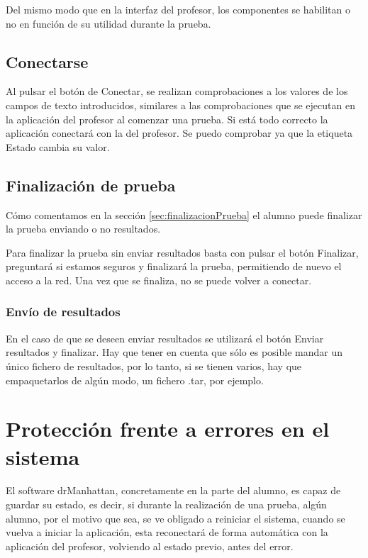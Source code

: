 \documentclass[11pt]{article}
\begin{document}
Del mismo modo que en la interfaz del profesor, los componentes se habilitan o no en función de su utilidad durante la prueba.

\subsection{Conectarse}
\label{sec:conectarse}

Al pulsar el botón de Conectar, se realizan comprobaciones a los valores de los campos de texto introducidos, similares a las comprobaciones que se ejecutan en la aplicación del profesor al comenzar una prueba. Si está todo correcto la aplicación conectará con la del profesor. Se puedo comprobar ya que la etiqueta Estado cambia su valor.

\subsection{Finalización de prueba}
\label{sec:finAlumno}

Cómo comentamos en la sección \ref{sec:finalizacionPrueba} el alumno puede finalizar la prueba enviando o no resultados.

Para finalizar la prueba sin enviar resultados basta con pulsar el botón Finalizar, preguntará si estamos seguros y finalizará la prueba, permitiendo de nuevo el acceso a la red. Una vez que se finaliza, no se puede volver a conectar.

\subsubsection{Envío de resultados}
\label{sec:finResultados}

En el caso de que se deseen enviar resultados se utilizará el botón Enviar resultados y finalizar. Hay que tener en cuenta que sólo es posible mandar un único fichero de resultados, por lo tanto, si se tienen varios, hay que empaquetarlos de algún modo, un fichero .tar, por ejemplo.

\newpage
\section{Protección frente a errores en el sistema}

El software drManhattan, concretamente en la parte del alumno, es capaz de guardar su estado, es decir, si durante la realización de una prueba, algún alumno, por el motivo que sea, se ve obligado a reiniciar el sistema, cuando se vuelva a iniciar la aplicación, esta reconectará de forma automática con la aplicación del profesor, volviendo al estado previo, antes del error.
\end{document}
